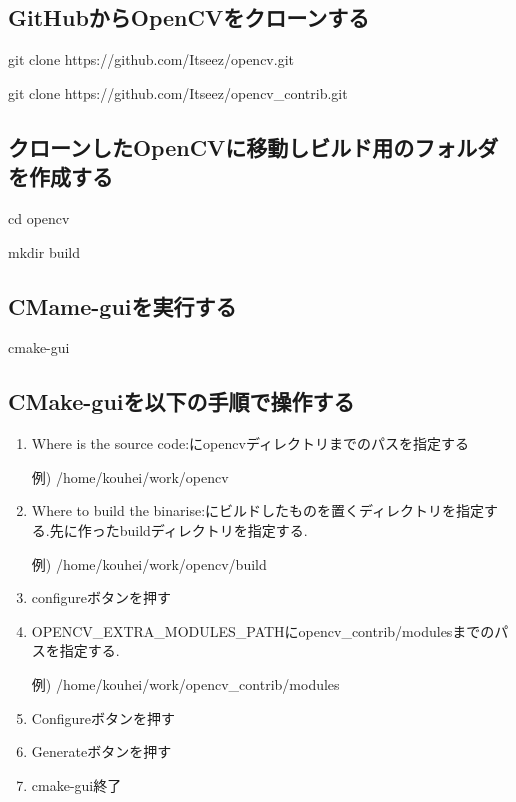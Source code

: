 \documentclass[12pt,oneside]{sotsuken_paper}
\begin{document}
\subsection{GitHubからOpenCVをクローンする}

git clone https://github.com/Itseez/opencv.git

git clone https://github.com/Itseez/opencv\_contrib.git

\subsection{クローンしたOpenCVに移動しビルド用のフォルダを作成する}

cd opencv

mkdir build

\subsection{CMame-guiを実行する}
cmake-gui

\subsection{CMake-guiを以下の手順で操作する}

\begin{enumerate}
\item Where is the source code:にopencvディレクトリまでのパスを指定する

例) /home/kouhei/work/opencv

\item Where to build the binarise:にビルドしたものを置くディレクトリを指定する.先に作ったbuildディレクトリを指定する.

例) /home/kouhei/work/opencv/build

\item configureボタンを押す

\item OPENCV\_EXTRA\_MODULES\_PATHにopencv\_contrib/modulesまでのパスを指定する.

例) /home/kouhei/work/opencv\_contrib/modules

\item Configureボタンを押す

\item Generateボタンを押す

\item cmake-gui終了

\end{enumerate}
\end{document}
